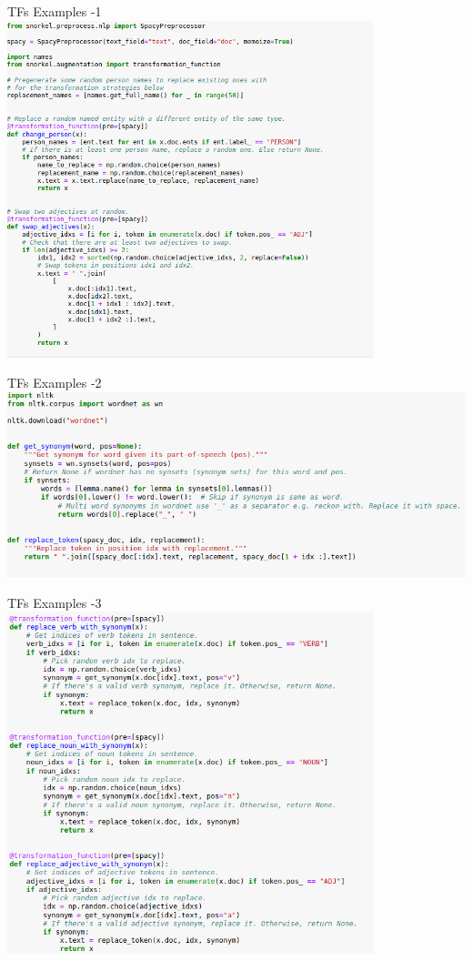 \documentclass{beamer}
\begin{document}
\begin{frame}{TFs Examples -1}
        \includegraphics[width=0.8\textwidth]{figures/tfspacy.png}
\end{frame}

\begin{frame}{TFs Examples -2}
        \includegraphics[width=\textwidth]{figures/tfsnltk1.png}
\end{frame}

\begin{frame}{TFs Examples -3}
        \includegraphics[width=0.8\textwidth]{figures/tfsnltk2.png}
\end{frame}
\end{document}
